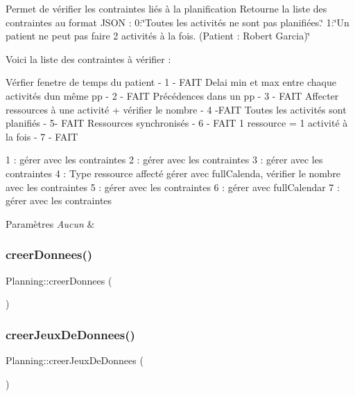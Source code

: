Permet de vérifier les contraintes liés à la planification Retourne la liste des contraintes au format J\+S\+ON \+: 0\+:\char`\"{}\+Toutes les activités ne sont pas planifiées.\char`\"{} 1\+:\char`\"{}\+Un patient ne peut pas faire 2 activités à la fois. (\+Patient \+: Robert Garcia)\char`\"{}

Voici la liste des contraintes à vérifier \+:

Vérfier fenetre de temps du patient -\/ 1 -\/ F\+A\+IT Delai min et max entre chaque activités d\textquotesingle{}un même pp -\/ 2 -\/ F\+A\+IT Précédences dans un pp -\/ 3 -\/ F\+A\+IT Affecter ressources à une activité + vérifier le nombre -\/ 4 -\/\+F\+A\+IT Toutes les activités sont planifiés -\/ 5-\/ F\+A\+IT Ressources synchronisés -\/ 6 -\/ F\+A\+IT 1 ressource = 1 activité à la fois -\/ 7 -\/ F\+A\+IT

1 \+: gérer avec les contraintes 2 \+: gérer avec les contraintes 3 \+: gérer avec les contraintes 4 \+: Type ressource affecté gérer avec full\+Calenda, vérifier le nombre avec les contraintes 5 \+: gérer avec les contraintes 6 \+: gérer avec full\+Calendar 7 \+: gérer avec les contraintes 
\begin{DoxyParams}{Paramètres}
{\em Aucun} & \\
\hline
\end{DoxyParams}
\mbox{\label{class_planning_a43c29aa96386074e1970bd897ff35a7f}} 
\subsubsection{\texorpdfstring{creer\+Donnees()}{creerDonnees()}}
{\footnotesize\ttfamily Planning\+::creer\+Donnees (\begin{DoxyParamCaption}{ }\end{DoxyParamCaption})}

\mbox{\label{class_planning_ab6b4d7163168dc39004b3efc72b03864}} 
\subsubsection{\texorpdfstring{creer\+Jeux\+De\+Donnees()}{creerJeuxDeDonnees()}}
{\footnotesize\ttfamily Planning\+::creer\+Jeux\+De\+Donnees (\begin{DoxyParamCaption}{ }\end{DoxyParamCaption})}



